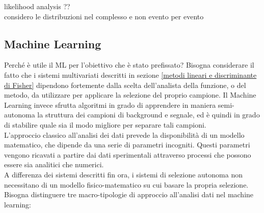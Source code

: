 \color{red}
likelihood analysis ?? \\
considero le distribuzioni nel complesso e non evento per evento
\color{black}



\newpage
\subsection{Machine Learning}
\label{ML}

Perché è utile il ML per l'obiettivo che è stato prefissato? Bisogna considerare il fatto che i sistemi multivariati descritti in sezione \ref{metodi lineari e discriminante di Fisher} dipendono fortemente dalla scelta dell'analista della funzione, o del metodo, da utilizzare per applicare la selezione del proprio campione. Il Machine Learning invece sfrutta algoritmi in grado di apprendere in maniera semi-autonoma la struttura dei campioni di background e segnale, ed è quindi in grado di stabilire quale sia il modo migliore per separare tali campioni. \\
L'approccio classico all'analisi dei dati prevede la disponibilità di un modello matematico, che dipende da una serie di parametri incogniti. Questi parametri vengono ricavati a partire dai dati sperimentali attraverso processi che possono essere sia analitici che numerici. \\
A differenza dei sistemi descritti fin ora, i sistemi di selezione autonoma non necessitano di un modello fisico-matematico su cui basare la propria selezione. \\
Bisogna distinguere tre macro-tipologie di approccio all'analisi dati nel machine learning:
